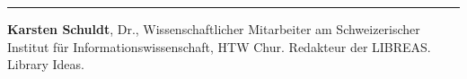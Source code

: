 \begin{center}\rule{0.5\linewidth}{\linethickness}\end{center}

\textbf{Karsten Schuldt}, Dr., Wissenschaftlicher Mitarbeiter am
Schweizerischer Institut für Informationswissenschaft, HTW Chur.
Redakteur der LIBREAS. Library Ideas.

